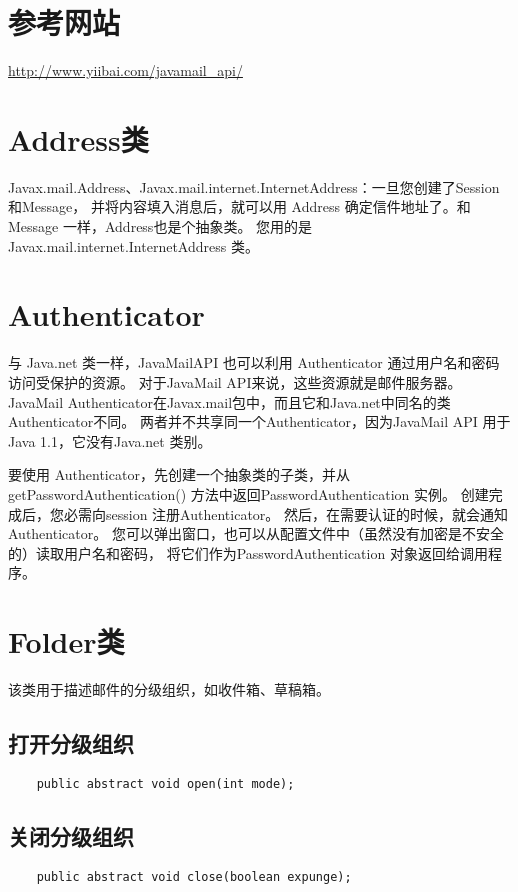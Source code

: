 \documentclass[a4paper,left=2.5cm,right=2.5cm,11pt]{article}
\begin{document}


\section{参考网站}
	\url{http://www.yiibai.com/javamail_api/}

\section{Address类}
	Javax.mail.Address、Javax.mail.internet.InternetAddress：一旦您创建了Session 和Message，
	并将内容填入消息后，就可以用 Address 确定信件地址了。和 Message 一样，Address也是个抽象类。
	您用的是Javax.mail.internet.InternetAddress 类。

\section{Authenticator}
	与 Java.net 类一样，JavaMailAPI 也可以利用 Authenticator 通过用户名和密码访问受保护的资源。
	对于JavaMail API来说，这些资源就是邮件服务器。
	JavaMail Authenticator在Javax.mail包中，而且它和Java.net中同名的类Authenticator不同。
	两者并不共享同一个Authenticator，因为JavaMail API 用于Java 1.1，它没有Java.net 类别。\par

	要使用 Authenticator，先创建一个抽象类的子类，并从getPasswordAuthentication() 方法中返回PasswordAuthentication 实例。
	创建完成后，您必需向session 注册Authenticator。
	然后，在需要认证的时候，就会通知Authenticator。
	您可以弹出窗口，也可以从配置文件中（虽然没有加密是不安全的）读取用户名和密码，
	将它们作为PasswordAuthentication 对象返回给调用程序。

\section{Folder类}
	该类用于描述邮件的分级组织，如收件箱、草稿箱。\par

\subsection{打开分级组织}
	\begin{lstlisting}
	public abstract void open(int mode);
	\end{lstlisting}

\subsection{关闭分级组织}
	\begin{lstlisting}
	public abstract void close(boolean expunge);
	\end{lstlisting}
\end{document}
